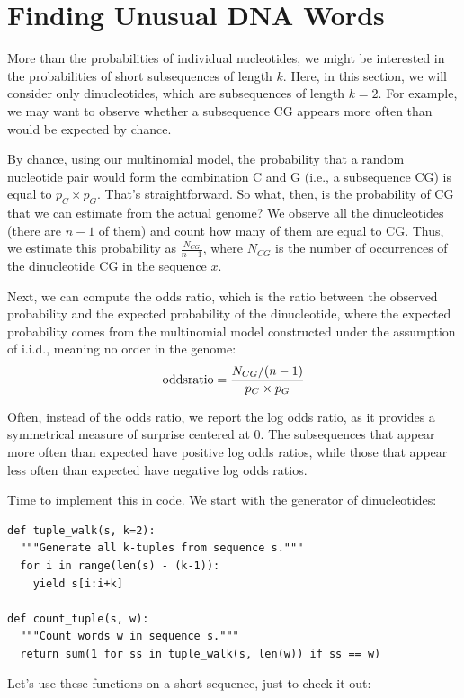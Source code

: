 \section*{Finding Unusual DNA Words}

More than the probabilities of individual nucleotides, we might be interested in the probabilities of short subsequences of length $k$. Here, in this section, we will consider only dinucleotides, which are subsequences of length $k=2$. For example, we may want to observe whether a subsequence CG appears more often than would be expected by chance. 

By chance, using our multinomial model, the probability that a random nucleotide pair would form the combination C and G (i.e., a subsequence CG) is equal to $p_C \times p_G$. That’s straightforward. So what, then, is the probability of CG that we can estimate from the actual genome? We observe all the dinucleotides (there are $n-1$ of them) and count how many of them are equal to CG. Thus, we estimate this probability as $\frac{N_{CG}}{n-1}$, where $N_{CG}$ is the number of occurrences of the dinucleotide CG in the sequence $x$.

Next, we can compute the odds ratio, which is the ratio between the observed probability and the expected probability of the dinucleotide, where the expected probability comes from the multinomial model constructed under the assumption of i.i.d., meaning no order in the genome:
\[
{\rm odds ratio} = \frac{N_{CG}/(n-1)}{p_C \times p_G}
\]

Often, instead of the odds ratio, we report the log odds ratio, as it provides a symmetrical measure of surprise centered at 0. The subsequences that appear more often than expected have positive log odds ratios, while those that appear less often than expected have negative log odds ratios.

Time to implement this in code. We start with the generator of dinucleotides:

\vspace*{3mm}
\begin{lstlisting}
def tuple_walk(s, k=2):
  """Generate all k-tuples from sequence s."""
  for i in range(len(s) - (k-1)):
    yield s[i:i+k]

def count_tuple(s, w):
  """Count words w in sequence s."""
  return sum(1 for ss in tuple_walk(s, len(w)) if ss == w)
\end{lstlisting}

Let's use these functions on a short sequence, just to check it out:

